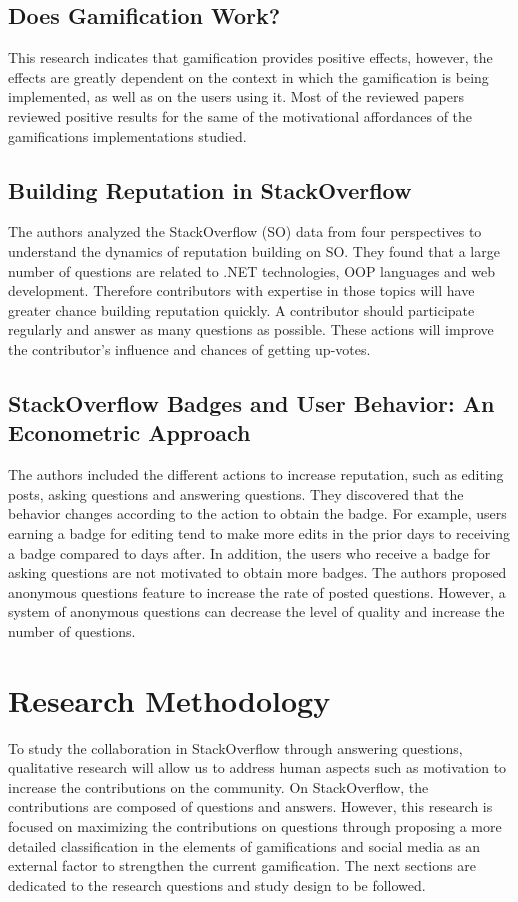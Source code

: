 \documentclass{sigchi}
\begin{document}
\subsection{Does Gamification Work?}

This research indicates that gamification provides positive effects, however,
the effects are greatly dependent on the context in which the gamification is
being implemented, as well as on the users using it. Most of the reviewed
papers reviewed positive results for the same of the motivational affordances
of the gamifications implementations studied.

\subsection{Building Reputation in StackOverflow}

The authors analyzed the StackOverflow (SO) data from four perspectives to
understand the dynamics of reputation building on SO. They found that a large
number of questions are related to .NET technologies, OOP languages and web
development. Therefore contributors with expertise in those topics will have
greater chance building reputation quickly. A contributor should participate
regularly and answer as many questions as possible. These actions will improve
the contributor’s influence and chances of getting up-votes.

\subsection{StackOverflow Badges and User Behavior: An Econometric Approach}

The authors included the different actions to increase reputation, such as
editing posts, asking questions and answering questions. They discovered that
the behavior changes according to the action to obtain the badge. For example,
users earning a badge for editing tend to make more edits in the prior days to
receiving a badge compared to days after. In addition, the users who receive a
badge for asking questions are not motivated to obtain more badges. The authors
proposed anonymous questions feature to increase the rate of posted questions.
However, a system of anonymous questions can decrease the level of quality and
increase the number of questions.


\section{Research Methodology}
To study the collaboration in StackOverflow through answering questions,
qualitative research will allow us to address human aspects such as motivation
to increase the contributions on the community. On StackOverflow, the
contributions are composed of questions and answers. However, this research is
focused on maximizing the contributions on questions through proposing a more
detailed classification in the elements of gamifications and social media as an
external factor to strengthen the current gamification. The next sections are
dedicated to the research questions and study design to be followed.
\end{document}
